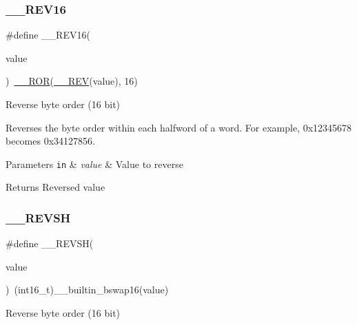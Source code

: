 \subsubsection{\texorpdfstring{\+\_\+\+\_\+\+R\+E\+V16}{\_\_REV16}}
{\footnotesize\ttfamily \#define \+\_\+\+\_\+\+R\+E\+V16(\begin{DoxyParamCaption}\item[{}]{value }\end{DoxyParamCaption})~\hyperlink{group___c_m_s_i_s___core___instruction_interface_gab16acb6456176f1e87a4f2724c2b6028}{\+\_\+\+\_\+\+R\+OR}(\hyperlink{group___c_m_s_i_s___core___instruction_interface_gadb92679719950635fba8b1b954072695}{\+\_\+\+\_\+\+R\+EV}(value), 16)}



Reverse byte order (16 bit) 

Reverses the byte order within each halfword of a word. For example, 0x12345678 becomes 0x34127856. 
\begin{DoxyParams}[1]{Parameters}
\mbox{\tt in}  & {\em value} & Value to reverse \\
\hline
\end{DoxyParams}
\begin{DoxyReturn}{Returns}
Reversed value 
\end{DoxyReturn}
\mbox{\label{group___c_m_s_i_s___core___instruction_interface_gae580812686119c9c5cf3c11a7519a404}} 
\subsubsection{\texorpdfstring{\+\_\+\+\_\+\+R\+E\+V\+SH}{\_\_REVSH}}
{\footnotesize\ttfamily \#define \+\_\+\+\_\+\+R\+E\+V\+SH(\begin{DoxyParamCaption}\item[{}]{value }\end{DoxyParamCaption})~(int16\+\_\+t)\+\_\+\+\_\+builtin\+\_\+bswap16(value)}



Reverse byte order (16 bit) 

